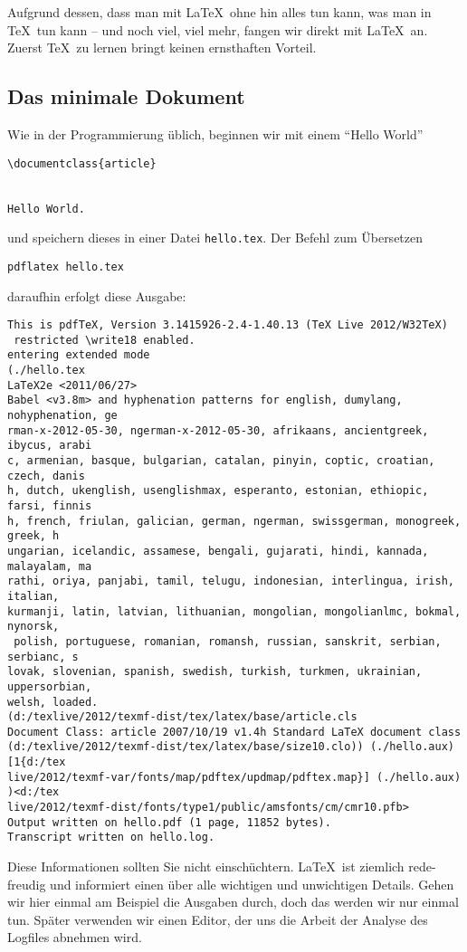 Aufgrund dessen, dass man mit \LaTeX\ ohne hin alles tun kann, was man in \TeX\ tun kann -- und noch viel, viel mehr, fangen wir direkt mit \LaTeX\ an. Zuerst \TeX\ zu lernen bringt keinen ernsthaften Vorteil. 

\subsection{Das minimale Dokument}

Wie in der Programmierung üblich, beginnen wir mit einem "`Hello World"'
\begin{verbatim}
\documentclass{article}


Hello World.

\end{verbatim}
und speichern dieses in einer Datei \texttt{hello.tex}. Der Befehl zum Übersetzen
\begin{verbatim}
pdflatex hello.tex
\end{verbatim}
daraufhin erfolgt diese Ausgabe:
\footnotesize
\begin{verbatim}
This is pdfTeX, Version 3.1415926-2.4-1.40.13 (TeX Live 2012/W32TeX)
 restricted \write18 enabled.
entering extended mode
(./hello.tex
LaTeX2e <2011/06/27>
Babel <v3.8m> and hyphenation patterns for english, dumylang, nohyphenation, ge
rman-x-2012-05-30, ngerman-x-2012-05-30, afrikaans, ancientgreek, ibycus, arabi
c, armenian, basque, bulgarian, catalan, pinyin, coptic, croatian, czech, danis
h, dutch, ukenglish, usenglishmax, esperanto, estonian, ethiopic, farsi, finnis
h, french, friulan, galician, german, ngerman, swissgerman, monogreek, greek, h
ungarian, icelandic, assamese, bengali, gujarati, hindi, kannada, malayalam, ma
rathi, oriya, panjabi, tamil, telugu, indonesian, interlingua, irish, italian,
kurmanji, latin, latvian, lithuanian, mongolian, mongolianlmc, bokmal, nynorsk,
 polish, portuguese, romanian, romansh, russian, sanskrit, serbian, serbianc, s
lovak, slovenian, spanish, swedish, turkish, turkmen, ukrainian, uppersorbian,
welsh, loaded.
(d:/texlive/2012/texmf-dist/tex/latex/base/article.cls
Document Class: article 2007/10/19 v1.4h Standard LaTeX document class
(d:/texlive/2012/texmf-dist/tex/latex/base/size10.clo)) (./hello.aux) [1{d:/tex
live/2012/texmf-var/fonts/map/pdftex/updmap/pdftex.map}] (./hello.aux) )<d:/tex
live/2012/texmf-dist/fonts/type1/public/amsfonts/cm/cmr10.pfb>
Output written on hello.pdf (1 page, 11852 bytes).
Transcript written on hello.log.
\end{verbatim}
\normalsize
Diese Informationen sollten Sie nicht einschüchtern. \LaTeX\ ist ziemlich rede-freudig und informiert einen über alle wichtigen und unwichtigen Details. Gehen wir hier einmal am Beispiel die Ausgaben durch, doch das werden wir nur einmal tun. Später verwenden wir einen Editor, der uns die Arbeit der Analyse des Logfiles abnehmen wird. 

